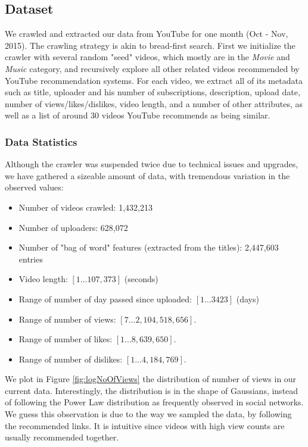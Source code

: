 \subsection{Dataset}
	We crawled and extracted our data from YouTube for one month (Oct - Nov, 2015). The crawling strategy is akin to bread-first search. First we initialize the crawler with several random "seed" videos, which mostly are in the \textit{Movie} and \textit{Music} category, and recursively explore all other related videos recommended by YouTube recommendation systems. For each video, we extract all of its metadata such as title, uploader and his number of subscriptions, description, upload date, number of views/likes/dislikes, video length, and a number of other attributes, as well as a list of around 30 videos YouTube recommends as being similar. 

	\subsubsection{Data Statistics}
		Although the crawler was suspended twice due to technical issues and upgrades, we have gathered a sizeable amount of data, with tremendous variation in the observed values:
		
		\begin{itemize}
			\item Number of videos crawled: 1,432,213
			\item Number of uploaders: 628,072
			\item Number of "bag of word" features (extracted from the titles): 2,447,603 entries
			\item Video length: $[1 \ldots 107,373]$ (seconds)
			\item Range of number of day passed since uploaded: $[1 \ldots 3423]$ (days)
			\item Range of number of views: $[7 \ldots 2,104,518,656]$.
			\item Range of number of likes: $[1 \ldots 8,639,650]$.
			\item Range of number of dislikes: $[1 \ldots 4,184,769]$.
		\end{itemize}

		We plot in Figure \ref{fig:logNoOfViews} the distribution of number of views in our current data. Interestingly, the distribution is in the shape of Gaussians, instead of following the Power Law distribution as frequently observed in social networks. We guess this observation is due to the way we sampled the data, by following the recommended links. It is intuitive since videos with high view counts are usually recommended together. 

